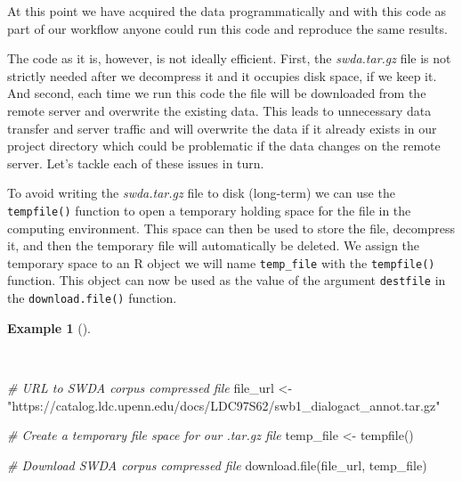 \documentclass[
  letterpaper,
]{latex/krantz}
\newenvironment{Shaded}{\begin{snugshade}}{\end{snugshade}}
\newcommand{\CommentTok}[1]{\textcolor[rgb]{0.00,0.00,0.00}{\textit{#1}}}
\newcommand{\FunctionTok}[1]{\textcolor[rgb]{0.00,0.00,0.00}{#1}}
\newcommand{\NormalTok}[1]{\textcolor[rgb]{0.00,0.00,0.00}{#1}}
\newcommand{\OtherTok}[1]{\textcolor[rgb]{0.00,0.00,0.00}{#1}}
\newcommand{\StringTok}[1]{\textcolor[rgb]{0.00,0.00,0.00}{#1}}
\theoremstyle{definition}
\newtheorem{example}{Example}[chapter]
\theoremstyle{remark}
\begin{document}
At this point we have acquired the data programmatically and with this
code as part of our workflow anyone could run this code and reproduce
the same results.

The code as it is, however, is not ideally efficient. First, the
\emph{swda.tar.gz} file is not strictly needed after we decompress it
and it occupies disk space, if we keep it. And second, each time we run
this code the file will be downloaded from the remote server and
overwrite the existing data. This leads to unnecessary data transfer and
server traffic and will overwrite the data if it already exists in our
project directory which could be problematic if the data changes on the
remote server. Let's tackle each of these issues in turn.

To avoid writing the \emph{swda.tar.gz} file to disk (long-term) we can
use the \texttt{tempfile()} function to open a temporary holding space
for the file in the computing environment. This space can then be used
to store the file, decompress it, and then the temporary file will
automatically be deleted. We assign the temporary space to an R object
we will name \texttt{temp\_file} with the \texttt{tempfile()} function.
This object can now be used as the value of the argument
\texttt{destfile} in the \texttt{download.file()} function.

\begin{example}[]\protect\hypertarget{exm-ad-swda-temp-file}{}\label{exm-ad-swda-temp-file}

~

\begin{Shaded}
\begin{Highlighting}[]
\CommentTok{\# URL to SWDA corpus compressed file}
\NormalTok{file\_url }\OtherTok{\textless{}{-}}
  \StringTok{"https://catalog.ldc.upenn.edu/docs/LDC97S62/swb1\_dialogact\_annot.tar.gz"}

\CommentTok{\# Create a temporary file space for our .tar.gz file}
\NormalTok{temp\_file }\OtherTok{\textless{}{-}} \FunctionTok{tempfile}\NormalTok{()}

\CommentTok{\# Download SWDA corpus compressed file}
\FunctionTok{download.file}\NormalTok{(file\_url, temp\_file)}
\end{Highlighting}
\end{Shaded}

\end{example}
\end{document}
